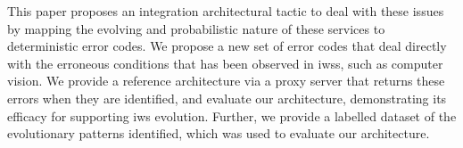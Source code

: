 This paper proposes an integration architectural tactic to deal with these issues by mapping the evolving and probabilistic nature of these services to deterministic error codes. We propose a new set of error codes that deal directly with the erroneous conditions that has been observed in \glspl{iws}, such as computer vision. We provide a reference architecture via a proxy server that returns these errors when they are identified, and evaluate our architecture, demonstrating its efficacy for supporting \gls{iws} evolution. Further, we provide a labelled dataset of the evolutionary patterns identified, which was used to evaluate our architecture.

